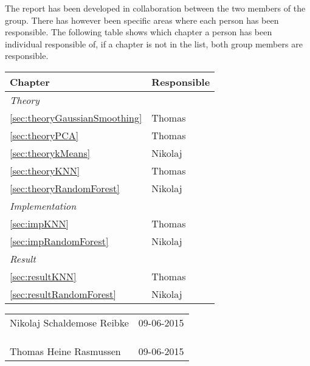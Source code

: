 \documentclass[report]{subfiles}
\begin{document}
The report has been developed in collaboration between the two members of the group. There has however been specific areas where each person has been responsible. The following table shows which chapter a person has been individual responsible of, if a chapter is not in the list, both group members are responsible.\\
	
\begin{tabularx}{\textwidth} {| l | X |}
	\hline
	\textbf{Chapter} & 
	\textbf{Responsible}\\
	\hline
	\textit{Theory}	& \\
	\ref{sec:theoryGaussianSmoothing} \nameref{sec:theoryGaussianSmoothing} & Thomas\\
	\ref{sec:theoryPCA} \nameref{sec:theoryPCA} & Thomas\\
	\ref{sec:theorykMeans} \nameref{sec:theorykMeans} & Nikolaj\\
	\ref{sec:theoryKNN} \nameref{sec:theoryKNN} & Thomas\\
	\ref{sec:theoryRandomForest} \nameref{sec:theoryRandomForest} & Nikolaj\\
	\hline
	\textit{Implementation} & \\
		\ref{sec:impKNN} \nameref{sec:impKNN} & Thomas \\
		\ref{sec:impRandomForest} \nameref{sec:impRandomForest} & Nikolaj \\
	\hline
	\textit{Result} & \\
		\ref{sec:resultKNN} \nameref{sec:resultKNN} & Thomas \\
		\ref{sec:resultRandomForest} \nameref{sec:resultRandomForest} & Nikolaj \\
	\hline
\end{tabularx}

\vfill
\begin{tabularx}{\textwidth}{X r}
\hline
Nikolaj Schaldemose Reibke  & 09-06-2015\\
\\
\\
\\
\hline
Thomas Heine Rasmussen		& 09-06-2015
\end{tabularx}
\end{document}
